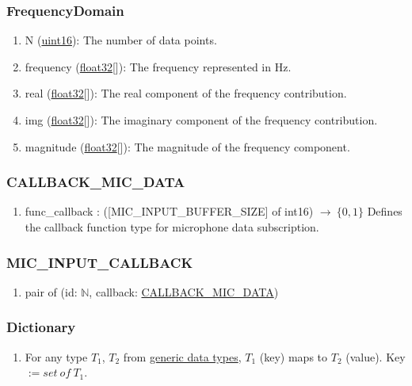 \documentclass[12pt, titlepage]{article}
\begin{document}
\subsubsection{FrequencyDomain}\label{struct:FrequencyDomain}
\begin{enumerate}
  \item N (\hyperref[generic:uint16]{uint16}): \label{state:FrequencyDomain:N}
    The number of data points.
  \item frequency (\hyperref[generic:float32]{float32}[]):
    \label{state:FrequencyDomain:frequency}
    The frequency represented in Hz.
  \item real (\hyperref[generic:float32]{float32}[]):
    \label{state:FrequencyDomain:real}
    The real component of the frequency contribution.
  \item img (\hyperref[generic:float32]{float32}[]):
    \label{state:FrequencyDomain:img}
    The imaginary component of the frequency contribution.
  \item magnitude (\hyperref[generic:float32]{float32}[]):
    \label{state:FrequencyDomain:magnitude}
    The magnitude of the frequency component.
\end{enumerate}

\subsubsection{CALLBACK\_MIC\_DATA} \label{ds:cb-mic-data}
\begin{enumerate}
  \item func\_callback : ([MIC\_INPUT\_BUFFER\_SIZE] of int16) \(\rightarrow\
  \{0, 1\}\) Defines the callback function type for microphone data
  subscription.
 
\end{enumerate}

\subsubsection{MIC\_INPUT\_CALLBACK} \label{ds:mic-input-callback}
\begin{enumerate}
  \item pair of (id: \(\mathbb{N}\), callback:
    \hyperref[ds:cb-mic-data]{CALLBACK\_MIC\_DATA})
\end{enumerate}

\subsubsection{Dictionary} \label{ds:dict}
\begin{enumerate}
  \item For any type $T_1$, $T_2$ from \hyperref[sec:generics]{generic data
  types}, $T_1$ (key) maps to $T_2$ (value). Key $:= set~of~T_1$.
\end{enumerate}
\end{document}
